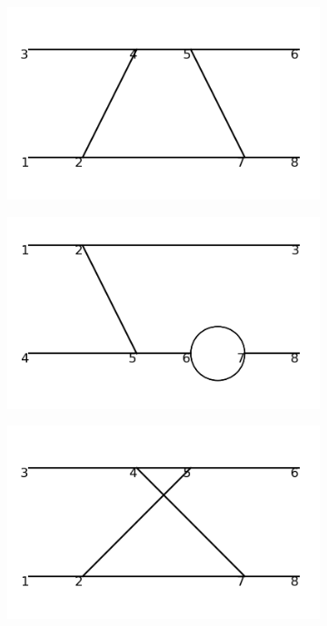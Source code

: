 \documentclass[11pt,a4paper,twoside,pdf]{article}
\numberwithin{equation}{section}
\begin{document}
\begin{figure}[h!]
\begin{subfigure}[t]{0.16\textwidth}
    \end{subfigure}
    \hfill
    \begin{subfigure}[t]{0.16\textwidth}
        \centering
        \includegraphics[width=\textwidth]{plots/order4_2to2/25.png}
    \end{subfigure}
    \hfill
    \begin{subfigure}[t]{0.16\textwidth}
        \centering
        \includegraphics[width=\textwidth]{plots/order4_2to2/26.png}
    \end{subfigure}
    \hfill
    \begin{subfigure}[t]{0.16\textwidth}
        \centering
        \includegraphics[width=\textwidth]{plots/order4_2to2/27.png}

\end{subfigure}
\end{figure}
\end{document}
